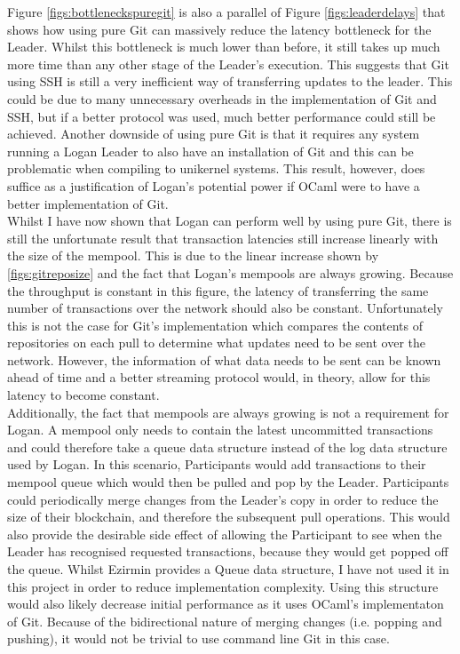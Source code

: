 \documentclass[12pt,a4paper,twoside,openright]{report}
\begin{document}
	Figure \ref{figs:bottleneckspuregit} is also a parallel of Figure \ref{figs:leaderdelays} that shows how using pure Git can massively reduce the latency bottleneck for the Leader.  
	Whilst this bottleneck is much lower than before, it still takes up much more time than any other stage of the Leader's execution.
	This suggests that Git using SSH is still a very inefficient way of transferring updates to the leader.  
	This could be due to many unnecessary overheads in the implementation of Git and SSH, but if a better protocol was used, much better performance could still be achieved. %
	Another downside of using pure Git is that it requires any system running a Logan Leader to also have an installation of Git and this can be problematic when compiling to unikernel systems. 
	This result, however, does suffice as a justification of Logan's potential power if OCaml were to have a better implementation of Git. \\

	Whilst I have now shown that Logan can perform well by using pure Git, there is still the unfortunate result that transaction latencies still increase linearly with the size of the mempool.
	This is due to the linear increase shown by \ref{figs:gitreposize} and the fact that Logan's mempools are always growing. 
	Because the throughput is constant in this figure, the latency of transferring the same number of transactions over the network should also be constant.
	Unfortunately this is not the case for Git's implementation which compares the contents of repositories on each pull to determine what updates need to be sent over the network. 
	However, the information of what data needs to be sent can be known ahead of time and a better streaming protocol would, in theory, allow for this latency to become constant. \\

	Additionally, the fact that mempools are always growing is not a requirement for Logan.
	A mempool only needs to contain the latest uncommitted transactions and could therefore take a queue data structure instead of the log data structure used by Logan.
	In this scenario, Participants would add transactions to their mempool queue which would then be pulled and pop by the Leader.
	Participants could periodically merge changes from the Leader's copy in order to reduce the size of their blockchain, and therefore the subsequent pull operations.
	This would also provide the desirable side effect of allowing the Participant to see when the Leader has recognised requested transactions, because they would get popped off the queue. 
	Whilst Ezirmin provides a Queue data structure, I have not used it in this project in order to reduce implementation complexity.
	Using this structure would also likely decrease initial performance as it uses OCaml's implementaton of Git.
	Because of the bidirectional nature of merging changes (i.e. popping and pushing), it would not be trivial to use command line Git in this case. \\
\end{document}
